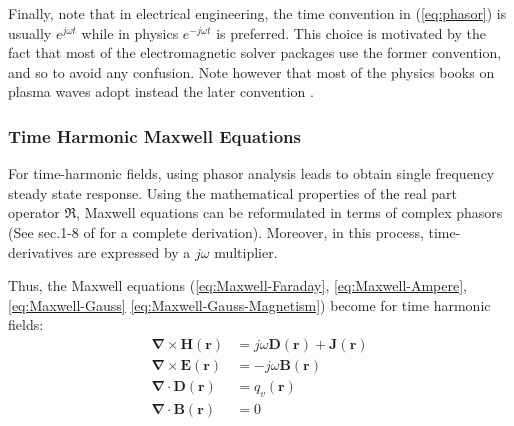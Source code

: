 Finally, note that in electrical engineering, the time convention in (\ref{eq:phasor}) is usually $e^{j\omega t}$ while in physics $e^{-j\omega t}$ is preferred\parencite{Bradley2007, Michelsen2017}. This choice is motivated by the fact that most of the electromagnetic solver packages use the former convention, and so to avoid any confusion. Note however that most of the physics books on plasma waves adopt instead the later convention \parencite{Swanson2003, Stix1992, Brambilla1998}.




\subsubsection{Time Harmonic Maxwell Equations}
For time-harmonic fields, using phasor analysis leads to obtain single frequency steady state response. Using the mathematical properties of the real part operator $\Re$, Maxwell equations can be reformulated in terms of complex phasors (See sec.1-8 of \parencite{Harrington2001} for a complete derivation). Moreover, in this process, time-derivatives are expressed by a $j\omega$ multiplier.  

Thus, the Maxwell equations (\ref{eq:Maxwell-Faraday}, \ref{eq:Maxwell-Ampere}, \ref{eq:Maxwell-Gauss} \ref{eq:Maxwell-Gauss-Magnetism}) become for time harmonic fields:
\begin{subequations}
	\begin{align}
	\boldsymbol{\nabla} \times \mathbf{H} (\mathbf{r}) &= j\omega\mathbf{D}(\mathbf{r}) + \mathbf{J}(\mathbf{r})  \label{eq:Maxwell-Faraday-Harmonic} \\
	\boldsymbol{\nabla} \times \mathbf{E} (\mathbf{r}) &= -j\omega\mathbf{B}(\mathbf{r}) \label{eq:Maxwell-Ampere-Harmonic} \\
	\boldsymbol{\nabla} \cdot \mathbf{D} (\mathbf{r}) &= q_v(\mathbf{r}) \label{eq:Maxwell-Gauss-Harmonic} \\
	\boldsymbol{\nabla} \cdot \mathbf{B} (\mathbf{r}) &= 0 \label{eq:Maxwell-Gauss-Magnetism-Harmonic} 
	\end{align}
	\label{eq:MaxwellEquationsTimeHarmonic}
\end{subequations}

